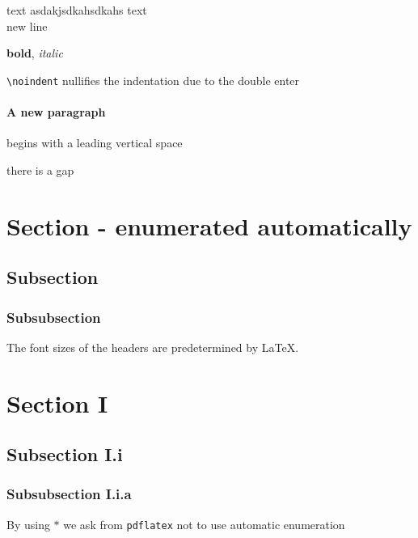 \documentclass[12pt]{article}                       %
\begin{document}
text                                %
asdakjsdkahsdkahs
text\\                              %
new line                            %

\textbf{bold}, \textit{italic}      %

\noindent
\verb|\noindent| nullifies the indentation due to the double enter
\paragraph{A new paragraph} begins with a leading vertical space


\vspace{20px}                       %
\noindent
there is a \hspace{20px} gap        %


\section{Section - enumerated automatically}
\subsection{Subsection}
\subsubsection{Subsubsection}
The font sizes of the headers are predetermined by \LaTeX.

\section*{Section I}
\subsection*{Subsection I.i}
\subsubsection*{Subsubsection I.i.a}
By using $*$ we ask from \verb|pdflatex| not to use automatic enumeration



\vspace{20px}
\end{document}
